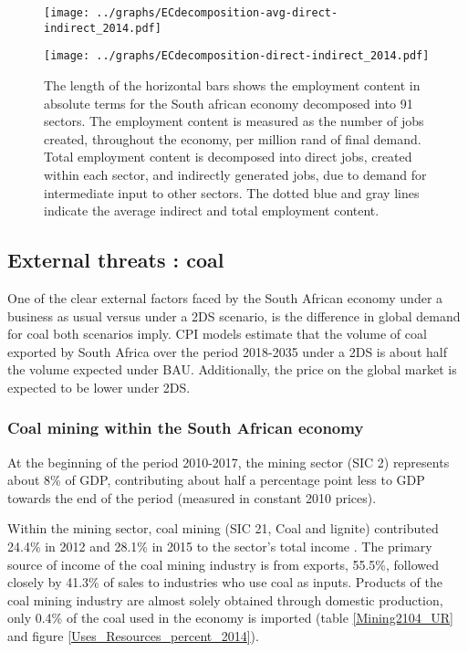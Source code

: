 \documentclass[12pt,english]{article}
\begin{document}
\begin{figure}[!ht]
	\centering
	\thispagestyle{empty}
		\texttt{[image: ../graphs/ECdecomposition-avg-direct-indirect\_2014.pdf]}
	\caption{\label{Decomposition_direct_indirect_avg}}
\end{figure}	



\begin{figure}[!ht]
	\centering
	\thispagestyle{empty}
		\texttt{[image: ../graphs/ECdecomposition-direct-indirect\_2014.pdf]}
	\caption{\label{Decomposition_direct_indirect_absolute} The length of the horizontal bars shows the employment content in absolute terms for the South african economy decomposed into 91 sectors. The employment content is measured as the number of jobs created, throughout the economy, per million rand of final demand. Total employment content is decomposed into direct jobs, created within each sector, and indirectly generated jobs, due to demand for intermediate input to other sectors. The dotted blue and gray lines indicate the average indirect and total employment content.}
\end{figure}	


\subsection{External threats : coal}

One of the clear external factors faced by the South African economy under a business as usual versus under a 2DS scenario, is the difference in global demand for coal both scenarios imply. CPI models estimate that the volume of coal exported by South Africa over the period 2018-2035 under a 2DS is about half the volume expected under BAU. Additionally, the price on the global market is expected to be lower under 2DS. 

\subsubsection{Coal mining within the South African economy}

At the beginning of the period 2010-2017, the mining sector (SIC 2) represents about 8\% of GDP, contributing about half a percentage point less to GDP towards the end of the period \citep{P0441StatSA2018Q2} (measured in constant 2010 prices). 

Within the mining sector, coal mining (SIC 21, Coal and lignite) contributed 24.4\% in 2012 and 28.1\% in 2015 to the sector's total income \citep{mining2015}. The primary source of income of the coal mining industry is from exports, 55.5\%, followed closely by 41.3\% of sales to 	industries who use coal as inputs. Products of the coal mining industry are almost solely obtained through domestic production, only 0.4\% of the coal used in the economy is imported (table \ref{Mining2104_UR} and figure \ref{Uses_Resources_percent_2014}).
\end{document}
